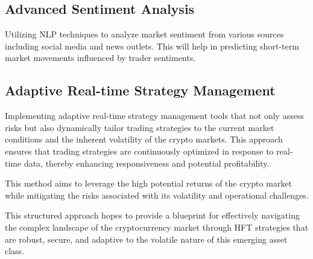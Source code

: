 \documentclass[conference]{IEEEtran}
\begin{document}
\subsection{Advanced Sentiment Analysis}
Utilizing NLP techniques to analyze market sentiment from various sources including social media and news outlets. This will help in predicting short-term market movements influenced by trader sentiments.

\subsection{Adaptive Real-time Strategy Management}
Implementing adaptive real-time strategy management tools that not only assess risks but also dynamically tailor trading strategies to the current market conditions and the inherent volatility of the crypto markets. This approach ensures that trading strategies are continuously optimized in response to real-time data, thereby enhancing responsiveness and potential profitability.

This method aims to leverage the high potential returns of the crypto market while mitigating the risks associated with its volatility and operational challenges.

This structured approach hopes to provide a blueprint for effectively navigating the complex landscape of the cryptocurrency market through HFT strategies that are robust, secure, and adaptive to the volatile nature of this emerging asset class.
\end{document}
